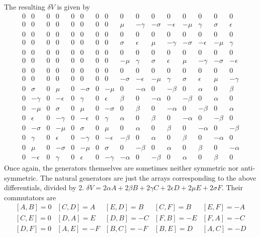 \documentclass[12pt]{article}
\begin{document}
The resulting $\delta V$ is given by
\begin{displaymath}
\begin{array}{cccccccccccccccc}
0 &0 &0 &0 &0 &0 &0 &0 &0 &0 &0 &0 &0 &0 &0 &0 \\
0 &0 &0 &0 &0 &0 &0 &0 &\mu &-\gamma &-\sigma &-\epsilon &-\mu &\gamma &\sigma &\epsilon \\
0 &0 &0 &0 &0 &0 &0 &0 &0 &0 &0 &0 &0 &0 &0 &0 \\
0 &0 &0 &0 &0 &0 &0 &0 &\sigma &\epsilon &\mu &-\gamma &-\sigma &-\epsilon &-\mu &\gamma \\
0 &0 &0 &0 &0 &0 &0 &0 &0 &0 &0 &0 &0 &0 &0 &0 \\
0 &0 &0 &0 &0 &0 &0 &0 &-\mu &\gamma &\sigma &\epsilon &\mu &-\gamma &-\sigma &-\epsilon \\
0 &0 &0 &0 &0 &0 &0 &0 &0 &0 &0 &0 &0 &0 &0 &0 \\
0 &0 &0 &0 &0 &0 &0 &0 &-\sigma &-\epsilon &-\mu &\gamma &\sigma &\epsilon &\mu &-\gamma \\
0 &\sigma &0 &\mu &0 &-\sigma &0 &-\mu &0 &-\alpha &0 &-\beta &0 &\alpha &0 &\beta \\
0 &-\gamma &0 &-\epsilon &0 &\gamma &0 &\epsilon &\beta &0 &-\alpha &0 &-\beta &0 &\alpha &0 \\
0 &-\mu &0 &\sigma &0 &\mu &0 &-\sigma &0 &\beta &0 &-\alpha &0 &-\beta &0 &\alpha \\
0 &\epsilon &0 &-\gamma &0 &-\epsilon &0 &\gamma &\alpha &0 &\beta &0 &-\alpha &0 &-\beta &0 \\
0 &-\sigma &0 &-\mu &0 &\sigma &0 &\mu &0 &\alpha &0 &\beta &0 &-\alpha &0 &-\beta \\
0 &\gamma &0 &\epsilon &0 &-\gamma &0 &-\epsilon &-\beta &0 &\alpha &0 &\beta &0 &-\alpha &0 \\
0 &\mu &0 &-\sigma &0 &-\mu &0 &\sigma &0 &-\beta &0 &\alpha &0 &\beta &0 &-\alpha \\
0 &-\epsilon &0 &\gamma &0 &\epsilon &0 &-\gamma &-\alpha &0 &-\beta &0 &\alpha &0 &\beta &0
\end{array}
\end{displaymath}
 Once again, the generators themselves are sometimes neither symmetric nor
anti-symmetric.
The natural generators are just the arrays corresponding to the
above differentials, divided by 2.  $\delta V = 2 \alpha A +
2\beta B + 2\gamma C + 2\epsilon D + 2\mu E + 2\sigma F$.
Their commutators are
\begin{displaymath}
\begin{array}{ccccc}
\left[A,B\right]=0 & \left[C,D\right]=A & \left[E,D\right]=B &
\left[C,F\right]=B & \left[E,F\right]=-A \\
\left[C,E\right]=0 & \left[D,A\right]=E & \left[D,B\right]=-C &
\left[F,B\right]=-E & \left[F,A\right]=-C \\
\left[D,F\right]=0 & \left[A,E\right]=-F & \left[B,C\right]=-F &
\left[B,E\right]=D & \left[A,C\right]=-D
\end{array}
\end{displaymath}
\end{document}

